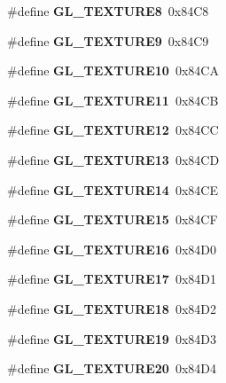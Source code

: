 \begin{DoxyCompactItemize}
\item 
\#define {\bfseries G\+L\+\_\+\+T\+E\+X\+T\+U\+R\+E8}~0x84\+C8\label{_s_d_l__opengl_8h_a77bab3d67794d30842400a30868f03ae}

\item 
\#define {\bfseries G\+L\+\_\+\+T\+E\+X\+T\+U\+R\+E9}~0x84\+C9\label{_s_d_l__opengl_8h_a0a199c41bfc291046eaaa1546b8418f7}

\item 
\#define {\bfseries G\+L\+\_\+\+T\+E\+X\+T\+U\+R\+E10}~0x84\+C\+A\label{_s_d_l__opengl_8h_a10ac92e56a389e6d61fa67fce9647343}

\item 
\#define {\bfseries G\+L\+\_\+\+T\+E\+X\+T\+U\+R\+E11}~0x84\+C\+B\label{_s_d_l__opengl_8h_ac2a90866d1cde7e6180739930c102f6e}

\item 
\#define {\bfseries G\+L\+\_\+\+T\+E\+X\+T\+U\+R\+E12}~0x84\+C\+C\label{_s_d_l__opengl_8h_a451e0157013321b6c4f00e47578f8d44}

\item 
\#define {\bfseries G\+L\+\_\+\+T\+E\+X\+T\+U\+R\+E13}~0x84\+C\+D\label{_s_d_l__opengl_8h_ad2bca89bea17bfd0fe0f3f64aab40549}

\item 
\#define {\bfseries G\+L\+\_\+\+T\+E\+X\+T\+U\+R\+E14}~0x84\+C\+E\label{_s_d_l__opengl_8h_a6c992a9191154ef9a7d224157b46f1ec}

\item 
\#define {\bfseries G\+L\+\_\+\+T\+E\+X\+T\+U\+R\+E15}~0x84\+C\+F\label{_s_d_l__opengl_8h_a6a3147750845b658205b5efe6a279a45}

\item 
\#define {\bfseries G\+L\+\_\+\+T\+E\+X\+T\+U\+R\+E16}~0x84\+D0\label{_s_d_l__opengl_8h_a552aba54f1f9531860c2b332fd0869b4}

\item 
\#define {\bfseries G\+L\+\_\+\+T\+E\+X\+T\+U\+R\+E17}~0x84\+D1\label{_s_d_l__opengl_8h_accdb7c47dae700218b31fb2b129ee0f4}

\item 
\#define {\bfseries G\+L\+\_\+\+T\+E\+X\+T\+U\+R\+E18}~0x84\+D2\label{_s_d_l__opengl_8h_a08cd70d6ead4e0219daa481299f8f10e}

\item 
\#define {\bfseries G\+L\+\_\+\+T\+E\+X\+T\+U\+R\+E19}~0x84\+D3\label{_s_d_l__opengl_8h_acdbdc0b3c774163814b3923049d7d532}

\item 
\#define {\bfseries G\+L\+\_\+\+T\+E\+X\+T\+U\+R\+E20}~0x84\+D4\label{_s_d_l__opengl_8h_a3a0a7bc78dccb9b36c17a8ec664473f8}


\end{DoxyCompactItemize}
